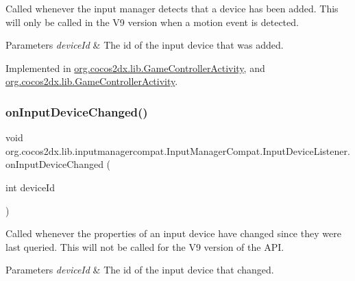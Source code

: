 Called whenever the input manager detects that a device has been added. This will only be called in the V9 version when a motion event is detected.


\begin{DoxyParams}{Parameters}
{\em device\+Id} & The id of the input device that was added. \\
\hline
\end{DoxyParams}


Implemented in \hyperlink{classorg_1_1cocos2dx_1_1lib_1_1GameControllerActivity_a25ed4cb26b6bac381d1befce69f7e638}{org.\+cocos2dx.\+lib.\+Game\+Controller\+Activity}, and \hyperlink{classorg_1_1cocos2dx_1_1lib_1_1GameControllerActivity_a25ed4cb26b6bac381d1befce69f7e638}{org.\+cocos2dx.\+lib.\+Game\+Controller\+Activity}.

\mbox{\label{interfaceorg_1_1cocos2dx_1_1lib_1_1inputmanagercompat_1_1InputManagerCompat_1_1InputDeviceListener_af65cf1e0f73f2a7326a8ea62f6764361}} 
\subsubsection{\texorpdfstring{on\+Input\+Device\+Changed()}{onInputDeviceChanged()}\hspace{0.1cm}{\footnotesize\ttfamily [1/2]}}
{\footnotesize\ttfamily void org.\+cocos2dx.\+lib.\+inputmanagercompat.\+Input\+Manager\+Compat.\+Input\+Device\+Listener.\+on\+Input\+Device\+Changed (\begin{DoxyParamCaption}\item[{int}]{device\+Id }\end{DoxyParamCaption})}

Called whenever the properties of an input device have changed since they were last queried. This will not be called for the V9 version of the A\+PI.


\begin{DoxyParams}{Parameters}
{\em device\+Id} & The id of the input device that changed. \\
\hline
\end{DoxyParams}


